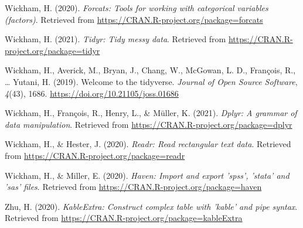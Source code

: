 \documentclass[
  english,
  man]{apa6}
\newlength{\cslhangindent}
\newenvironment{cslreferences}%
  {\setlength{\parindent}{0pt}%
  \everypar{\setlength{\hangindent}{\cslhangindent}}\ignorespaces}%
  {\par}
\begin{document}
\begin{cslreferences}
\leavevmode\hypertarget{ref-R-forcats}{}%
Wickham, H. (2020). \emph{Forcats: Tools for working with categorical variables (factors)}. Retrieved from \url{https://CRAN.R-project.org/package=forcats}

\leavevmode\hypertarget{ref-R-tidyr}{}%
Wickham, H. (2021). \emph{Tidyr: Tidy messy data}. Retrieved from \url{https://CRAN.R-project.org/package=tidyr}

\leavevmode\hypertarget{ref-R-tidyverse}{}%
Wickham, H., Averick, M., Bryan, J., Chang, W., McGowan, L. D., François, R., \ldots{} Yutani, H. (2019). Welcome to the tidyverse. \emph{Journal of Open Source Software}, \emph{4}(43), 1686. \url{https://doi.org/10.21105/joss.01686}

\leavevmode\hypertarget{ref-R-dplyr}{}%
Wickham, H., François, R., Henry, L., \& Müller, K. (2021). \emph{Dplyr: A grammar of data manipulation}. Retrieved from \url{https://CRAN.R-project.org/package=dplyr}

\leavevmode\hypertarget{ref-R-readr}{}%
Wickham, H., \& Hester, J. (2020). \emph{Readr: Read rectangular text data}. Retrieved from \url{https://CRAN.R-project.org/package=readr}

\leavevmode\hypertarget{ref-R-haven}{}%
Wickham, H., \& Miller, E. (2020). \emph{Haven: Import and export 'spss', 'stata' and 'sas' files}. Retrieved from \url{https://CRAN.R-project.org/package=haven}

\leavevmode\hypertarget{ref-R-kableExtra}{}%
Zhu, H. (2020). \emph{KableExtra: Construct complex table with 'kable' and pipe syntax}. Retrieved from \url{https://CRAN.R-project.org/package=kableExtra}
\end{cslreferences}

\endgroup
\end{document}
